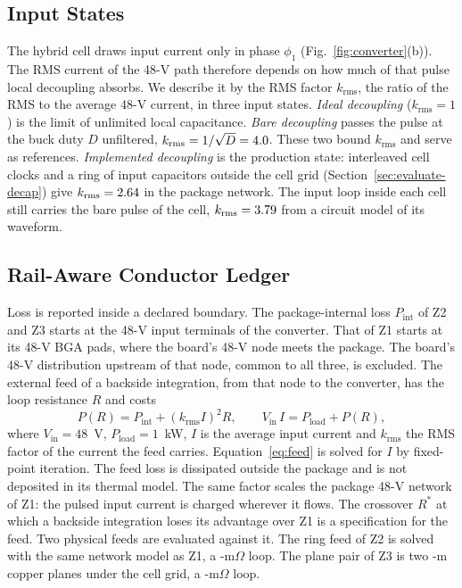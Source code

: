 \subsection{Input States}\label{sec:scenarios}
The hybrid cell draws input current only in phase $\phi_1$ (Fig.~\ref{fig:converter}(b)). The RMS
current of the 48-V path therefore depends on how much of that pulse local decoupling absorbs.
We describe it by the RMS factor $k_{\mathrm{rms}}$, the ratio of the RMS to the average 48-V
current, in three input states. \emph{Ideal decoupling} ($k_{\mathrm{rms}} = 1$) is the limit of
unlimited local capacitance. \emph{Bare decoupling} passes the pulse at the buck duty $D$
unfiltered, $k_{\mathrm{rms}} = 1/\sqrt{D} = 4.0$. These two bound $k_{\mathrm{rms}}$ and
serve as references. \emph{Implemented decoupling} is the production state: interleaved cell clocks and a ring of input capacitors outside the cell grid
(Section~\ref{sec:evaluate-decap}) give $k_{\mathrm{rms}} = 2.64$ in the package network. The
input loop inside each cell still carries the bare pulse of the cell, $k_{\mathrm{rms}} =
3.79$ from a circuit model of its waveform.

\subsection{Rail-Aware Conductor Ledger}\label{sec:ledger}
Loss is reported inside a declared boundary. The package-internal loss $P_{\mathrm{int}}$ of Z2
and Z3 starts at the 48-V input terminals of the converter. That of Z1 starts at its 48-V BGA pads, where the board's 48-V node meets the package. The board's
48-V distribution upstream of that node, common to all three, is excluded. The external feed of a
backside integration, from that node to the converter, has the loop resistance $R$ and costs
\begin{equation}
P(R) = P_{\mathrm{int}} + \left(k_{\mathrm{rms}} I\right)^2 R,\qquad
V_{\mathrm{in}}\, I = P_{\mathrm{load}} + P(R),
\label{eq:feed}
\end{equation}
where $V_{\mathrm{in}} = 48$~V, $P_{\mathrm{load}} = 1$~kW, $I$ is the average input current and
$k_{\mathrm{rms}}$ the RMS factor of the current the feed carries. Equation~\eqref{eq:feed} is
solved for $I$ by fixed-point iteration. The feed loss is dissipated outside the package and is
not deposited in its thermal model. The same factor scales the package 48-V network of Z1: the
pulsed input current is charged wherever it flows. The crossover $R^{\ast}$ at which a backside
integration loses its advantage over Z1 is a specification for the feed. Two physical feeds are
evaluated against it. The ring feed of Z2 is solved with the same network model as Z1, a
\FeedRbgaZtwo-m$\Omega$ loop. The plane pair of Z3 is two \MthFeedPlaneT-\textmu m copper planes
under the cell grid, a \FeedRZthree-m$\Omega$ loop.

